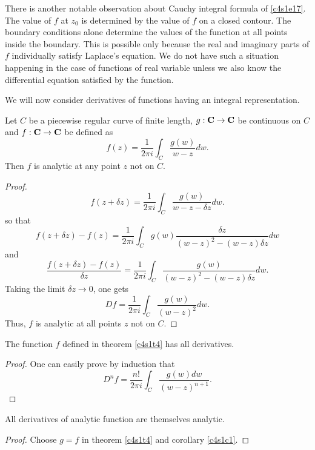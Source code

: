 There is another notable observation about Cauchy integral formula of 
\eqref{c4s1e17}. The value of $f$ at $z_0$ is determined by the value of $f$
on a closed contour. The boundary conditions alone determine the values of the
function at all points inside the boundary. This is possible only because the
real and imaginary parts of $f$ individually satisfy Laplace's equation. We do
not have such a situation happening in the case of functions of real variable 
unless we also know the differential equation satisfied by the function.

We will now consider derivatives of functions having an integral representation.
\begin{thm}\label{c4s1t4}
Let $C$ be a piecewise regular curve of finite length, $g: \mathbf{C}\rightarrow\mathbf{C}$
be continuous on $C$ and $f:\mathbf{C}\rightarrow\mathbf{C}$ be defined as
\[
f(z) = \frac{1}{2\pi i}\int_C \frac{g(w)}{w - z}dw.
\]
Then $f$ is analytic at any point $z$ not on $C$.
\end{thm}
\begin{proof}
\[
f(z + \delta z) = \frac{1}{2\pi i}\int_C \frac{g(w)}{w - z - \delta z}dw.
\]
so that
\[
f(z + \delta z) - f(z) = \frac{1}{2\pi i}\int_C g(w)\frac{\delta z}{(w - z)^2
- (w - z)\delta z}dw
\]
and
\[
\frac{f(z+\delta z) - f(z)}{\delta z} = \frac{1}{2\pi i}
\int_C \frac{g(w)}{(w - z)^2 - (w - z)\delta z}dw.
\]
Taking the limit $\delta z \rightarrow 0$, one gets
\[
Df = \frac{1}{2\pi i}\int_C \frac{g(w)}{(w - z)^2}dw.
\]
Thus, $f$ is analytic at all points $z$ not on $C$.
\end{proof}

\begin{cor}\label{c4s1c1}
The function $f$ defined in theorem \eqref{c4s1t4} has all derivatives.
\end{cor}
\begin{proof}
One can easily prove by induction that
\begin{equation}\label{c4s1e19}
D^nf = \frac{n!}{2\pi i}\int_C \frac{g(w)dw}{(w - z)^{n+1}}.
\end{equation}
\end{proof}

\begin{cor}\label{c4s1c2}
All derivatives of analytic function are themselves analytic.
\end{cor}
\begin{proof}
Choose $g = f$ in theorem \ref{c4s1t4} and corollary \ref{c4s1c1}.
\end{proof}

